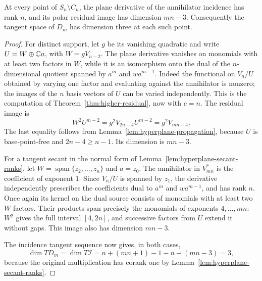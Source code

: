 \begin{lemma}
\label{lem:hyperplane-residual-smoothness}
At every point of $S_n\setminus C_n$, the plane derivative of the
annihilator incidence has rank $n$, and its polar residual image has
dimension $mn-3$. Consequently the tangent space of $D_m$ has
dimension three at each such point.
\end{lemma}
\begin{proof}
For distinct support, let $g$ be its vanishing quadratic and write
$U=W\oplus\mathbb C a$, with $W=gV_{n-2}$. The plane derivative vanishes
on monomials with at least two factors in $W$, while it is an
isomorphism onto the dual of the $n$-dimensional quotient spanned by
$a^m$ and $wa^{m-1}$. Indeed the functional on $V_n/U$ obtained by
varying one factor and evaluating against the annihilator is nonzero;
the images of the $n$ basis vectors of $U$ can be varied independently.
This is the computation of Theorem~\ref{thm:higher-residual}, now
with $c=n$. The residual image is
\[
 W^2U^{m-2}=g^2V_{2n-4}U^{m-2}=g^2V_{mn-4}.
\]
The last equality follows from
Lemma~\ref{lem:hyperplane-propagation}, because $U$ is
base-point-free and $2n-4\ge n-1$. Its dimension is $mn-3$.

For a tangent secant in the normal form of
Lemma~\ref{lem:hyperplane-secant-ranks}, let
$W=\operatorname{span}\{z_2,\ldots,z_n\}$ and $a=z_0$.
The annihilator in $V_{mn}^*$ is the coefficient of exponent $1$.
Since $V_n/U$ is spanned by $z_1$, the derivative independently
prescribes the coefficients dual to $a^m$ and $wa^{m-1}$, and has
rank $n$. Once again its kernel on the dual source consists of
monomials with at least two $W$ factors. Their products span precisely
the monomials of exponents $4,\ldots,mn$: $W^2$ gives the full
interval $[4,2n]$, and successive factors from $U$ extend it without
gaps. This image also has dimension $mn-3$.

The incidence tangent sequence now gives, in both cases,
\[
 \dim T D_m=\dim T\mathcal I
      =n+(mn+1)-1-n-(mn-3)=3,
\]
because the original multiplication has corank one by
Lemma~\ref{lem:hyperplane-secant-ranks}.
\end{proof}

